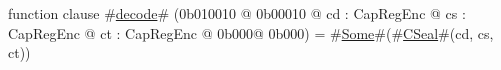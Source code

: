 function clause #\hyperref[zdecode]{decode}# (0b010010 @ 0b00010 @ cd : CapRegEnc @ cs : CapRegEnc @ ct : CapRegEnc @ 0b000@ 0b000) = #\hyperref[zSome]{Some}#(#\hyperref[zCSeal]{CSeal}#(cd, cs, ct))
